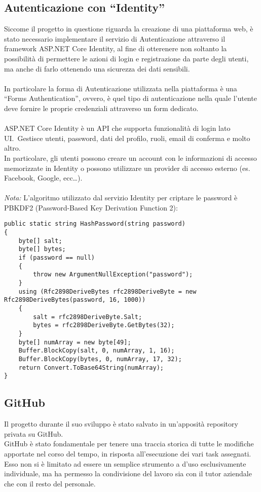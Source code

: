 \subsection{Autenticazione con ``Identity''}\label{sec:cap_sec_subsec}
Siccome il progetto in questione riguarda la creazione di una piattaforma web, è stato necessario
implementare il servizio di Autenticazione attraverso il framework ASP.NET Core Identity, al
fine di otterenere non soltanto la possibilità di permettere le azioni di login e registrazione da parte degli utenti, ma
anche di farlo ottenendo una sicurezza dei dati sensibili. 
\\ \\
In particolare la forma di Autenticazione utilizzata nella piattaforma è una ``Forms Authentication'', ovvero, è quel tipo di
autenticazione nella quale l'utente deve fornire le proprie credenziali attraverso un form dedicato. 
\\ \\
ASP.NET Core Identity è un API che supporta funzionalità di login lato UI.\ Gestisce utenti,
password, dati del profilo, ruoli, email di conferma e molto altro. \\
In particolare, gli utenti possono creare un account con le informazioni di accesso memorizzate in Identity 
o possono utilizzare un provider di accesso esterno (es. Facebook, Google, ecc\dots ).
\\ \\
\textit{Nota:} L'algoritmo utilizzato dal servizio Identity per criptare le password è PBKDF2 (Password-Based Key Derivation Function 2):
\begin{lstlisting}[style=cs_style, caption=algoritmo di hashing per criptare le password usato dal servizio Identity]
public static string HashPassword(string password)
{
    byte[] salt;
    byte[] bytes;
    if (password == null)
    {
        throw new ArgumentNullException("password");
    }
    using (Rfc2898DeriveBytes rfc2898DeriveByte = new Rfc2898DeriveBytes(password, 16, 1000))
    {
        salt = rfc2898DeriveByte.Salt;
        bytes = rfc2898DeriveByte.GetBytes(32);
    }
    byte[] numArray = new byte[49];
    Buffer.BlockCopy(salt, 0, numArray, 1, 16);
    Buffer.BlockCopy(bytes, 0, numArray, 17, 32);
    return Convert.ToBase64String(numArray);
}
    \end{lstlisting}


\subsection{GitHub}\label{sec:cap_sec_subsec}
Il progetto durante il suo sviluppo è stato salvato in un'apposità repository privata
su GitHub. \\
GitHub è stato fondamentale per tenere una traccia storica di tutte le
modifiche apportate nel corso del tempo, in risposta all'esecuzione dei vari task assegnati. \\
Esso non si è limitato ad essere un semplice strumento a d'uso esclusivamente
individuale, ma ha permesso la condivisione del lavoro sia con il tutor 
aziendale che con il resto del personale.
